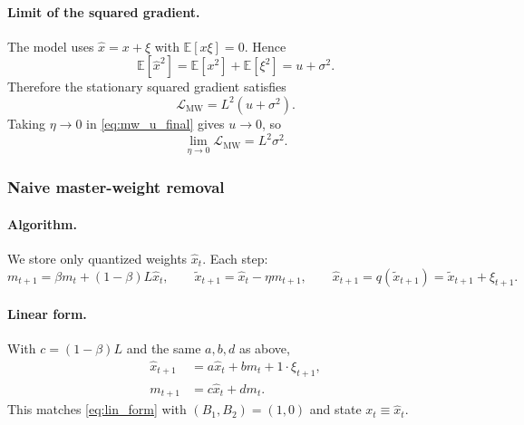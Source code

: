\documentclass[11pt, a4paper, onecolumn, copyright, goog]{google}
\newcommand{\E}{\mathbb{E}}
\theoremstyle{plain}
\theoremstyle{definition}
\theoremstyle{remark}
\begin{document}
\paragraph{Limit of the squared gradient.}
The model uses $\hat x=x+\xi$ with $\E[x\xi]=0$. Hence
\begin{equation}
    \E[\hat x^2]=\E[x^2]+\E[\xi^2]=u+\sigma^2.
\end{equation}
Therefore the stationary squared gradient satisfies
\begin{equation}
\label{eq:mw_L}
    \mathcal L_{\mathrm{MW}} = L^2(u+\sigma^2).
\end{equation}
Taking $\eta\to 0$ in \eqref{eq:mw_u_final} gives $u\to 0$, so
\begin{equation}
\label{eq:mw_limit}
    \lim_{\eta\to 0}\mathcal L_{\mathrm{MW}} = L^2\sigma^2.
\end{equation}

\subsubsection{Naive master-weight removal}

\paragraph{Algorithm.}
We store only quantized weights $\hat x_t$. Each step:
\begin{equation}
    m_{t+1}=\beta m_t + (1-\beta)L\hat x_t,\qquad \tilde x_{t+1}=\hat x_t-\eta m_{t+1},\qquad
    \hat x_{t+1}=q(\tilde x_{t+1})=\tilde x_{t+1}+\xi_{t+1}.
\end{equation}

\paragraph{Linear form.}
With $c=(1-\beta)L$ and the same $a,b,d$ as above,
\begin{equation}
\label{eq:naive_lin}
\begin{aligned}
    \hat x_{t+1} &= a\hat x_t + b m_t + 1\cdot \xi_{t+1},\\
    m_{t+1} &= c\hat x_t + d m_t.
\end{aligned}
\end{equation}
This matches \eqref{eq:lin_form} with $(B_1,B_2)=(1,0)$ and state $x_t\equiv \hat x_t$.
\end{document}
